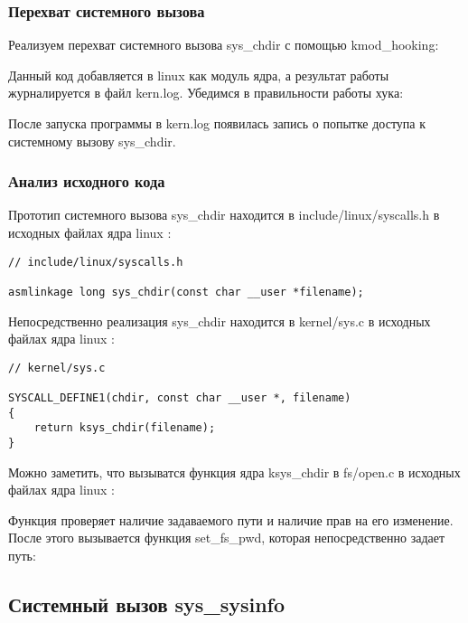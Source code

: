 \documentclass[14pt,a4paper,report]{report}
\begin{document}
\subsubsection{Перехват системного вызова}

Реализуем перехват системного вызова sys\_chdir с помощью kmod\_hooking:



Данный код добавляется в linux как модуль ядра, а результат работы журналируется в файл kern.log. Убедимся в правильности работы хука:



После запуска программы в kern.log появилась запись о попытке доступа к системному вызову sys\_chdir.

\subsubsection{Анализ исходного кода}

Прототип системного вызова sys\_chdir находится в include/linux/syscalls.h в исходных файлах ядра linux \cite{cite-linux-syscalls}:

\begin{lstlisting}
// include/linux/syscalls.h

asmlinkage long sys_chdir(const char __user *filename);
\end{lstlisting}

Непосредственно реализация sys\_chdir находится в kernel/sys.c в исходных файлах ядра linux \cite{cite-linux-sys}:

\begin{lstlisting}
// kernel/sys.c

SYSCALL_DEFINE1(chdir, const char __user *, filename)
{
    return ksys_chdir(filename);
}
\end{lstlisting}

Можно заметить, что вызыватся функция ядра ksys\_chdir в fs/open.c в исходных файлах ядра linux \cite{cite-linux-fs-open}:



Функция проверяет наличие задаваемого пути и наличие прав на его изменение. После этого вызывается функция set\_fs\_pwd, которая непосредственно задает путь:



\subsection{Системный вызов sys\_sysinfo}
\end{document}
